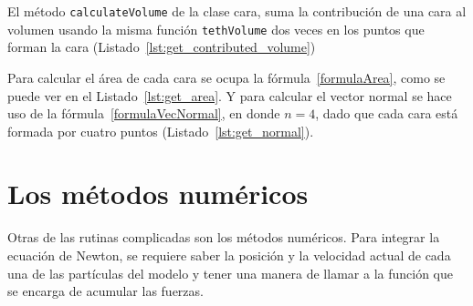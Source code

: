 
El método \texttt{calculateVolume} de la clase cara, suma la contribución de una cara al volumen usando la misma función \texttt{tethVolume} dos veces en los puntos que forman la cara (Listado~\ref{lst:get_contributed_volume})


Para calcular el área de cada cara se ocupa la fórmula~\eqref{formulaArea}, como se puede ver en el Listado~\ref{lst:get_area}.
Y para calcular el vector normal se hace uso de la fórmula~\eqref{formulaVecNormal}, en donde $n=4$, dado que cada cara está formada por cuatro puntos (Listado~\ref{lst:get_normal}).



\section{Los métodos numéricos}
Otras de las rutinas complicadas son los métodos numéricos.
Para integrar la ecuación de Newton, se requiere saber la posición y la velocidad actual de cada una de las partículas del modelo y tener una manera de llamar a la función que se encarga de acumular las fuerzas.

